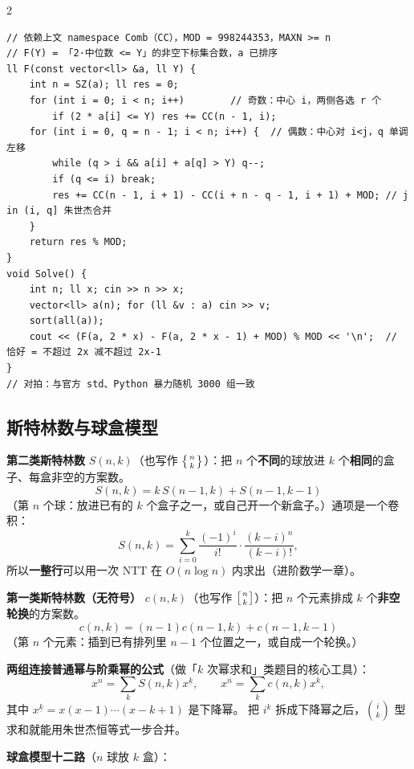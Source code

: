 \begin{multicols*}{2}
		\begin{verbatim}
// 依赖上文 namespace Comb（CC），MOD = 998244353，MAXN >= n
// F(Y) = 「2·中位数 <= Y」的非空下标集合数，a 已排序
ll F(const vector<ll> &a, ll Y) {
	int n = SZ(a); ll res = 0;
	for (int i = 0; i < n; i++)        // 奇数：中心 i，两侧各选 r 个
		if (2 * a[i] <= Y) res += CC(n - 1, i);
	for (int i = 0, q = n - 1; i < n; i++) {  // 偶数：中心对 i<j，q 单调左移
		while (q > i && a[i] + a[q] > Y) q--;
		if (q <= i) break;
		res += CC(n - 1, i + 1) - CC(i + n - q - 1, i + 1) + MOD; // j in (i, q] 朱世杰合并
	}
	return res % MOD;
}
void Solve() {
	int n; ll x; cin >> n >> x;
	vector<ll> a(n); for (ll &v : a) cin >> v;
	sort(all(a));
	cout << (F(a, 2 * x) - F(a, 2 * x - 1) + MOD) % MOD << '\n';  // 恰好 = 不超过 2x 减不超过 2x-1
}
// 对拍：与官方 std、Python 暴力随机 3000 组一致
		\end{verbatim}

		\subsection{斯特林数与球盒模型}

		\textbf{第二类斯特林数} $S(n,k)$（也写作 $\left\{{n\atop k}\right\}$）：把 $n$ 个\textbf{不同}的球放进 $k$ 个\textbf{相同}的盒子、每盒非空的方案数。
		\[
			S(n,k)
			= k\,S(n-1,k) + S(n-1,k-1)
		\]
		（第 $n$ 个球：放进已有的 $k$ 个盒子之一，或自己开一个新盒子。）通项是一个卷积：
		\[
			S(n,k)
			= \sum_{i=0}^{k}\frac{(-1)^i}{i!}\cdot\frac{(k-i)^n}{(k-i)!},
		\]
		所以\textbf{一整行}可以用一次 NTT 在 $O(n\log n)$ 内求出（进阶数学一章）。

		\textbf{第一类斯特林数（无符号）} $c(n,k)$（也写作 $\left[{n\atop k}\right]$）：把 $n$ 个元素排成 $k$ 个\textbf{非空轮换}的方案数。
		\[
			c(n,k)
			= (n-1)c(n-1,k) + c(n-1,k-1)
		\]
		（第 $n$ 个元素：插到已有排列里 $n-1$ 个位置之一，或自成一个轮换。）

		\textbf{两组连接普通幂与阶乘幂的公式}（做「$k$ 次幂求和」类题目的核心工具）：
		\[
			x^{n} = \sum_{k}S(n,k) x^{\underline{k}},
			\qquad
			x^{\overline{n}} = \sum_{k}c(n,k) x^{k},
		\]
		其中 $x^{\underline k} = x(x-1)\cdots(x-k+1)$ 是下降幂。
		把 $i^k$ 拆成下降幂之后，$\binom{i}{k}$ 型求和就能用朱世杰恒等式一步合并。

		\textbf{球盒模型十二路}（$n$ 球放 $k$ 盒）：


\end{multicols*}
